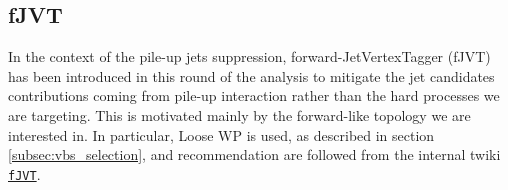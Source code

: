 \subsection{fJVT}
\label{subsec:fjvt}

In the context of the pile-up jets suppression, forward-JetVertexTagger (fJVT) has been introduced in this round of the analysis to mitigate the jet candidates contributions coming from pile-up interaction rather than the hard processes we are targeting. This is motivated mainly by the forward-like topology we are interested in. In particular, Loose WP is used, as described in section \ref{subsec:vbs_selection}, and recommendation are followed from the internal twiki \mbox{\texttt{\href{https://twiki.cern.ch/twiki/bin/view/AtlasProtected/PileupJetRecommendations}{fJVT}}}.
